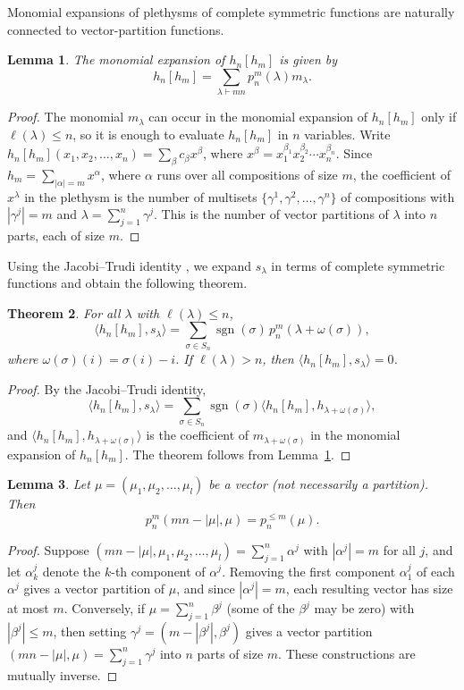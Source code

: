 \documentclass[reqno]{amsart}
\theoremstyle{plain}
\newtheorem{theorem}{Theorem}[section]
\newtheorem{lemma}[theorem]{Lemma}
\theoremstyle{definition}
\theoremstyle{remark}
\theoremstyle{plain}
\DeclareMathOperator{\sgn}{sgn}
\begin{document}
Monomial expansions of plethysms of complete symmetric functions are naturally
connected to vector-partition functions.

\begin{lemma}\label{monomial-complete} The monomial expansion of $h_n[h_m]$ is given by
    $$h_n[h_m]=\sum_{\lambda\vdash mn}p_n^m({\lambda})m_\lambda.$$
\end{lemma}
\begin{proof}
The monomial $m_\lambda$ can occur in the monomial expansion of $h_n[h_m]$ only
if $\ell(\lambda)\leq n$, so it is enough to evaluate $h_n[h_m]$ in $n$
variables. Write $h_n[h_m](x_1,x_2,\dots,x_n)=\sum_\beta c_\beta x^\beta$, where
$x^\beta=x_1^{\beta_1}x_2^{\beta_2}\cdots x_n^{\beta_n}$. Since
$h_m=\sum_{|\alpha|=m} x^\alpha$, where $\alpha$ runs over all compositions of
size $m$, the coefficient of $x^\lambda$ in the plethysm is the number of
multisets $\{\gamma^1,\gamma^2,\dots,\gamma^n\}$ of compositions with
$|\gamma^j|=m$ and $\lambda=\sum_{j=1}^n\gamma^j$. This is the number of vector
partitions of $\lambda$ into $n$ parts, each of size $m$.
\end{proof}

Using the Jacobi--Trudi identity \cite[p.~342]{stanley}, we expand $s_\lambda$
in terms of complete symmetric functions and obtain the following theorem.

\begin{theorem}\label{schur-exp-plethysm}
For all $\lambda$ with $\ell(\lambda)\leq n$,
$$\langle h_n[h_m],s_{\lambda}\rangle=\sum_{\sigma\in S_n}\sgn(\sigma)\, p_n^m(\lambda+\omega(\sigma)),$$
where $\omega(\sigma)(i)=\sigma(i)-i$. If $\ell(\lambda)>n$, then
$\langle h_n[h_m],s_{\lambda}\rangle=0$.
\end{theorem}
\begin{proof}
By the Jacobi--Trudi identity,
$$\langle h_n[h_m],s_\lambda\rangle=\sum_{\sigma\in S_n}\sgn(\sigma)\langle h_n[h_m],h_{\lambda+\omega(\sigma)}\rangle,$$
and $\langle h_n[h_m],h_{\lambda+\omega(\sigma)}\rangle$ is the coefficient of
$m_{\lambda+\omega(\sigma)}$ in the monomial expansion of $h_n[h_m]$. The
theorem follows from Lemma~\ref{monomial-complete}.
\end{proof}

\begin{lemma}\label{stability-of-vecpar}
Let $\mu=(\mu_1,\mu_2,\dots,\mu_l)$ be a vector (not necessarily a partition). Then
$$p_n^m(mn-|\mu|,\mu)=p_n^{\leq m}(\mu).$$
\end{lemma}
\begin{proof}
Suppose $(mn-|\mu|,\mu_1,\mu_2,\dots,\mu_l)=\sum_{j=1}^n\alpha^j$ with
$|\alpha^j|=m$ for all $j$, and let $\alpha_k^j$ denote the $k$-th component of
$\alpha^j$. Removing the first component $\alpha_1^j$ of each $\alpha^j$ gives a
vector partition of $\mu$, and since $|\alpha^j|=m$, each resulting vector has
size at most $m$. Conversely, if $\mu=\sum_{j=1}^n\beta^{j}$ (some of the
$\beta^j$ may be zero) with $|\beta^j|\leq m$, then setting
$\gamma^j=(m-|\beta^j|,\beta^j)$ gives a vector partition
$(mn-|\mu|,\mu)=\sum_{j=1}^n\gamma^j$ into $n$ parts of size $m$. These
constructions are mutually inverse.
\end{proof}
\end{document}
